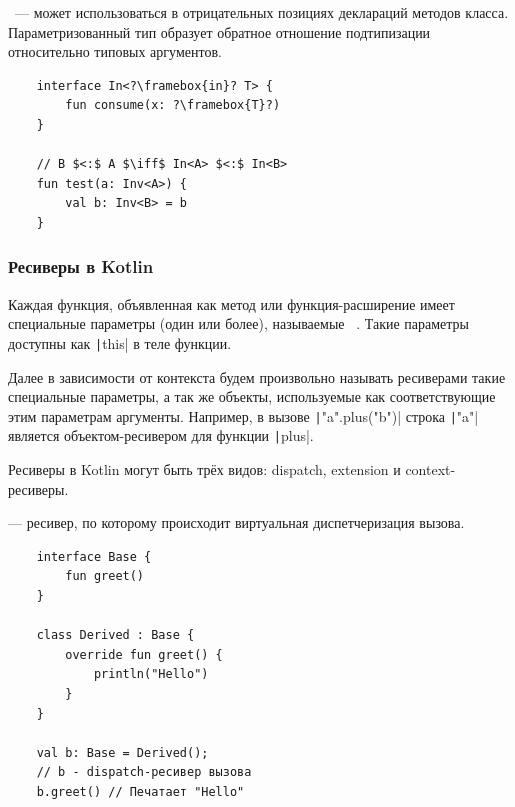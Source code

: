 \begin{definition}
    \label{def:contravariant}
    ~--- может использоваться в отрицательных позициях деклараций методов класса.
    Параметризованный тип образует обратное отношение подтипизации относительно типовых аргументов.
\end{definition}

\begin{verbatim}
    interface In<?\framebox{in}? T> {
        fun consume(x: ?\framebox{T}?)
    }

    // B $<:$ A $\iff$ In<A> $<:$ In<B>
    fun test(a: Inv<A>) {
        val b: Inv<B> = b
    }
\end{verbatim}

\subsubsection{Ресиверы в Kotlin}

\begin{definition}
    \label{def:receivers}
    Каждая функция, объявленная как метод или функция-расширение имеет специальные параметры (один или более), называемые ~\cite{akhin2021kotlin}.
    Такие параметры доступны как \texttt|this| в теле функции.
\end{definition}

Далее в зависимости от контекста будем произвольно называть ресиверами такие специальные параметры, а так же объекты, используемые как соответствующие этим параметрам аргументы.
Например, в вызове \texttt|"a".plus("b")| строка \texttt|"a"| является объектом-ресивером для функции \texttt|plus|.

Ресиверы в Kotlin могут быть трёх видов: dispatch, extension и context-ресиверы.

\begin{definition}
    \label{def:dispatch-receivers}
     --- ресивер, по которому происходит виртуальная диспетчеризация вызова.
\end{definition}

\begin{verbatim}
    interface Base {
        fun greet()
    }

    class Derived : Base {
        override fun greet() {
            println("Hello")
        }
    }

    val b: Base = Derived();
    // b - dispatch-ресивер вызова
    b.greet() // Печатает "Hello"
\end{verbatim}

